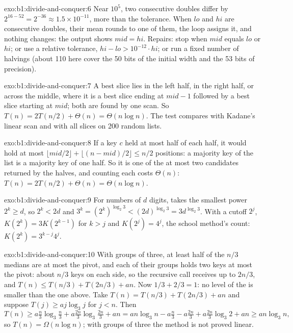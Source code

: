 \begin{solution}{exo:b1:divide-and-conquer:6}
Near $10^5$, two consecutive doubles differ by $2^{16 - 52} = 2^{-36} \approx 1.5 \times 10^{-11}$, more than the
tolerance. When $lo$ and $hi$ are consecutive doubles, their mean rounds to one of them, the loop assigns it, and
nothing changes: the output shows $mid = hi$. Repairs: stop when $mid$ equals $lo$ or $hi$; or use a relative tolerance,
$hi - lo > 10^{-12} \cdot hi$; or run a fixed number of halvings (about 110 here cover the 50 bits of the initial width
and the 53 bits of precision).
\end{solution}

\begin{solution}{exo:b1:divide-and-conquer:7}
A best slice lies in the left half, in the right half, or across the middle, where it is a best slice ending at $mid -
1$ followed by a best slice starting at $mid$; both are found by one scan. So $T(n) = 2T(n/2) + \Theta(n) = \Theta(n
\log n)$. The test compares with Kadane's linear scan and with all slices on 200 random lists.
\end{solution}

\begin{solution}{exo:b1:divide-and-conquer:8}
If a key $c$ held at most half of each half, it would hold at most $\lfloor mid/2 \rfloor + \lfloor (n - mid)/2 \rfloor
\leq n/2$ positions: a majority key of the list is a majority key of one half. So it is one of the at most two
candidates returned by the halves, and counting each costs $\Theta(n)$: $T(n) = 2T(n/2) + \Theta(n) = \Theta(n \log n)$.
\end{solution}

\begin{solution}{exo:b1:divide-and-conquer:9}
For numbers of $d$ digits,  takes the smallest power $2^k \geq d$, so $2^k < 2d$ and $3^k = (2^k)^{\log_2
3} < (2d)^{\log_2 3} = 3 d^{\log_2 3}$. With a cutoff $2^j$, $K(2^k) = 3K(2^{k-1})$ for $k > j$ and $K(2^j) = 4^j$, the
school method's count: $K(2^k) = 3^{k-j} 4^j$.
\end{solution}

\begin{solution}{exo:b1:divide-and-conquer:10}
With groups of three, at least half of the $n/3$ medians are at most the pivot, and each of their groups holds two keys
at most the pivot: about $n/3$ keys on each side, so the recursive call receives up to $2n/3$, and $T(n) \leq T(n/3) +
T(2n/3) + an$. Now $1/3 + 2/3 = 1$: no level of the  is smaller than the one above. Take $T(n) = T(n/3) +
T(2n/3) + an$ and suppose $T(j) \geq a j \log_3 j$ for $j < n$. Then
\[ T(n) \geq a\tfrac n3 \log_3 \tfrac n3 + a\tfrac{2n}{3} \log_3 \tfrac{2n}{3} + an = an \log_3 n - a\tfrac n3 -
a\tfrac{2n}3 + a\tfrac{2n}3 \log_3 2 + an \geq an \log_3 n, \]
so $T(n) = \Omega(n \log n)$; with groups of three the method is not proved linear.
\end{solution}

